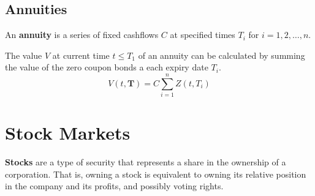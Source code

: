 \documentclass{article}
\begin{document}
  \subsection{Annuities}

    \begin{definition}[Annuity]
      An \textbf{annuity} is a series of fixed cashflows $C$ at specified times $T_i$ for $i = 1, 2, \ldots, n$. 
    \end{definition}

    \begin{theorem}
      The value $V$ at current time $t \leq T_1$ of an annuity can be calculated by summing the value of the zero coupon bonds a each expiry date $T_i$. 
      \begin{equation}
        V(t, \mathbf{T}) = C \sum_{i=1}^n Z(t, T_i)
      \end{equation}
    \end{theorem}

\section{Stock Markets}

    \begin{definition}[Stocks]
      \textbf{Stocks} are a type of security that represents a share in the ownership of a corporation. That is, owning a stock is equivalent to owning its relative position in the company and its profits, and possibly voting rights. 
    \end{definition}
\end{document}
